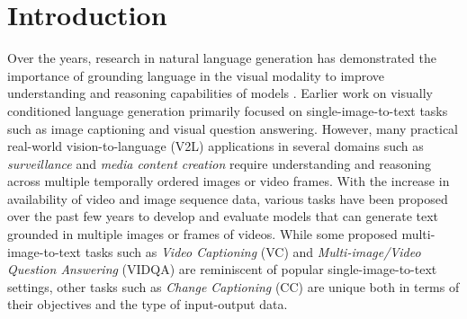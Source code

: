 \section{Introduction}

Over the years, research in natural language generation has demonstrated the importance of grounding language in the visual modality to improve understanding and reasoning capabilities of models \cite{mm_reasoning0,mm_reasoning1,mm_reasoning2}. Earlier work on visually conditioned language generation primarily focused on single-image-to-text tasks such as image captioning and visual question answering. However, many practical real-world vision-to-language (V2L) applications in several domains such as \textit{surveillance} and \textit{media content creation} require understanding and reasoning across multiple temporally ordered images or video frames. With the increase in availability of video and image sequence data, various tasks have been proposed over the past few years to develop and evaluate models that can generate text grounded in multiple images or frames of videos. While some proposed multi-image-to-text tasks such as \textit{Video Captioning} (\color{xkcdVividBlue}VC\color{black}) \cite{vc_task} and \textit{Multi-image/Video Question Answering} (\color{xkcdVividBlue}VIDQA\color{black}) \cite{videoqa,miqa} are reminiscent of popular single-image-to-text settings, other tasks such as \textit{Change Captioning} (\color{xkcdVividBlue}CC\color{black}) \cite{cc_spot_the_diff} are unique both in terms of their objectives and the type of input-output data.


